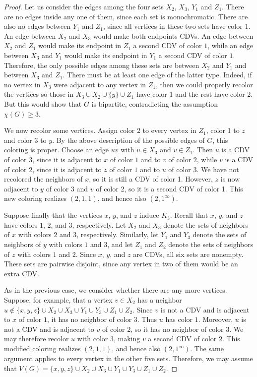 \documentclass{article}
\theoremstyle{definition}
\begin{document}
\begin{proof}
Let us consider the edges among the four sets $X_2$, $X_3$, $Y_1$ and $Z_1$. 
There are no edges inside any one of them, since each set is monochromatic.
There are also no edges between $Y_1$ and $Z_1$, since all vertices in these two sets have color $1$. 
An edge between $X_2$ and $X_3$ would make both endpoints CDVs.
An edge between $X_2$ and $Z_1$ would make its endpoint in $Z_1$ a second CDV of color $1$, while an edge between $X_3$ and $Y_1$ would make its endpoint in $Y_1$ a second CDV of color $1$.
Therefore, the only possible edges among these sets are between $X_2$ and $Y_1$ and between $X_3$ and $Z_1$.
There must be at least one edge of the latter type.
Indeed, if no vertex in $X_3$ were adjacent to any vertex in $Z_1$, then we could properly recolor the vertices so those in $X_3\cup X_2\cup\{y\}\cup Z_1$ have color 1 and the rest have color 2.
But this would show that $G$ is bipartite, contradicting the assumption $\chi(G)\geq3$.

We now recolor some vertices.
Assign color 2 to every vertex in $Z_1$, color 1 to $z$ and color 3 to $y$.
By the above description of the possible edges of $G$, this coloring is proper. 
Choose an edge $uv$ with $u\in X_3$ and $v\in Z_1$.
Then $u$ is a CDV of color $3$, since it is adjacent to $x$ of color $1$ and to $v$ of color $2$, while $v$ is a CDV of color $2$, since it is adjacent to $z$ of color $1$ and to $u$ of color $3$. 
We have not recolored the neighbors of $x$, so it is still a CDV of color 1.
However, $z$ is now adjacent to $y$ of color 3 and $v$ of color 2, so it is a second CDV of color 1.
This new coloring realizes $(2,1,1)$, and hence also $(2,1^\infty)$.

\smallskip

Suppose finally that the vertices $x$, $y$, and $z$ induce $\overline{K_3}$. Recall that $x$, $y$, and $z$ have colors $1$, $2$, and $3$, respectively. Let $X_2$ and $X_3$ denote the sets of neighbors of $x$ with colors $2$ and $3$, respectively. Similarly, let $Y_1$ and $Y_3$ denote the sets of neighbors of $y$ with colors $1$ and $3$, and let $Z_1$ and $Z_2$ denote the sets of neighbors of $z$ with colors $1$ and $2$. Since $x$, $y$, and $z$ are CDVs, all six sets are nonempty. 
These sets are pairwise disjoint, since any vertex in two of them would be an extra CDV.

As in the previous case, we consider whether there are any more vertices.
Suppose, for example, that a vertex $v\in X_2$ has a neighbor
$u\notin\{x,y,z\}\cup X_2\cup X_3\cup Y_1\cup Y_3\cup Z_1\cup Z_2$.
Since $v$ is not a CDV and is adjacent to $x$ of color $1$, it has no neighbor of color $3$. Thus $u$ has color $1$. Moreover, $u$ is not a CDV and is adjacent to $v$ of color $2$, so it has no neighbor of color $3$. We may therefore recolor $u$ with color $3$, making $v$ a second CDV of color $2$. This modified coloring realizes $(2,1,1)$, and hence also $(2,1^\infty)$. The same argument applies to every vertex in the other five sets. Therefore, we may assume that
$V(G)=\{x,y,z\}\cup X_2\cup X_3\cup Y_1\cup Y_3\cup Z_1\cup Z_2$.


\end{proof}
\end{document}
